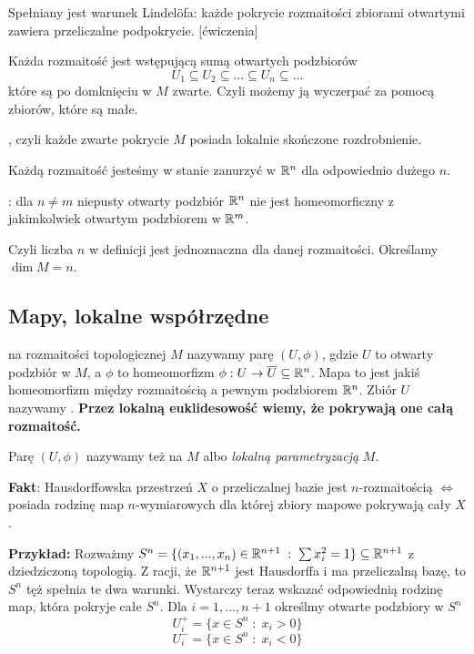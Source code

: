 \indent \point Spełniany jest warunek Lindel\"ofa: każde pokrycie rozmaitości zbiorami otwartymi zawiera przeliczalne podpokrycie. [ćwiczenia]

\indent \point Każda rozmaitość jest wstępującą sumą otwartych podzbiorów
$$U_1\subseteq U_2\subseteq ...\subseteq U_n\subseteq...$$
które są po domknięciu w $M$ zwarte. Czyli możemy ją wyczerpać za pomocą zbiorów, które są małe.

\indent \point {}, czyli każde zwarte pokrycie $M$ posiada lokalnie skończone rozdrobnienie.

\indent \point Każdą rozmaitość jesteśmy w stanie zanurzyć w $\mathbb{R}^n$ dla odpowiednio dużego $n$.
\medskip

\smallskip

\indent \point {}: dla $n\neq m$ niepusty otwarty podzbiór $\mathbb{R}^n$ nie jest homeomorficzny z jakimkolwiek otwartym podzbiorem w $\mathbb{R}^m$. 

\indent \point Czyli liczba $n$ w definicji jest jednoznaczna dla danej rozmaitości. Określamy  $\dim M=n$.

\subsection{Mapy, lokalne współrzędne}

 na rozmaitości topologicznej $M$ nazywamy parę $(U, \phi)$, gdzie $U$ to otwarty podzbiór w $M$, a $\phi$ to homeomorfizm $\phi:U\to \overline U\subseteq \mathbb{R}^n$. Mapa to jest jakiś homeomorfizm między rozmaitością a pewnym podzbiorem $\mathbb{R}^n$. Zbiór $U$ nazywamy . \textbf{Przez lokalną euklidesowość wiemy, że pokrywają one całą rozmaitość.} 

Parę $(U, \phi)$ nazywamy też  na $M$ albo \emph{lokalną parametryzacją} $M$.
\smallskip

\textbf{Fakt}: Hausdorffowska przestrzeń $X$ o przeliczalnej bazie jest $n$-rozmaitością $\iff$ posiada rodzinę map $n$-wymiarowych dla której zbiory mapowe pokrywają cały $X$.
\medskip

\textbf{\large Przykład:} Rozważmy $S^n=\{(x_1,...,x_n)\in\mathbb{R}^{n+1}\;:\;\sum x_i^2=1\}\subseteq \mathbb{R}^{n+1}$ z dziedziczoną topologią. Z racji, że $\mathbb{R}^{n+1}$ jest Hausdorffa i ma przeliczalną bazę, to $S^n$ tęż spełnia te dwa warunki. Wystarczy teraz wskazać odpowiednią rodzinę map, która pokryje całe $S^n$. Dla $i=1,..., n+1$ określmy otwarte podzbiory w $S^n$
$$U_i^+=\{x\in S^n\;:\;x_i>0\}$$
$$U_i^-=\{x\in S^n\;:\;x_i<0\}$$

